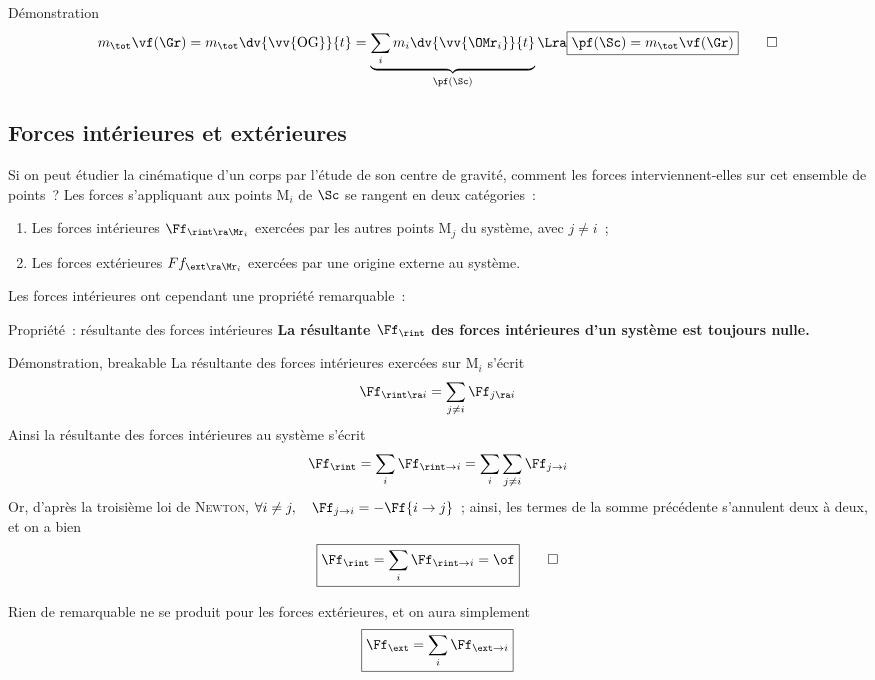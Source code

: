 \documentclass[../main/main.tex]{subfiles}
\begin{document}
\begin{tdemo}{Démonstration}
    \begin{gather*}
        m_{\tot}\vf(\Gr) = m_{\tot}\dv{\vv{\rm OG}}{t} =
            \underbrace{\sum_i m_i \dv{\vv{\OMr_i}}{t}}_{\pf(\Sc)}
        \Lra
        \boxed{\pf(\Sc) = m_{\tot}\vf(\Gr)}
        \qed
    \end{gather*}
\end{tdemo}

\subsection{Forces intérieures et extérieures}
Si on peut étudier la cinématique d'un corps par l'étude de son centre de
gravité, comment les forces interviennent-elles sur cet ensemble de points~?
Les forces s'appliquant aux points M$_i$ de $\Sc$ se rangent en deux
catégories~:
\begin{enumerate}
    \item Les forces intérieures $\Ff_{\rint\ra\Mr_i}$ exercées par les autres
        points M$_j$ du système, avec $j\neq i$~;
    \item Les forces extérieures $Ff_{\ext\ra\Mr_i}$ exercées par une origine
        externe au système.
\end{enumerate}
Les forces intérieures ont cependant une propriété remarquable~:
\begin{tprop}{Propriété~: résultante des forces intérieures}
    \centering\bfseries
    La résultante $\Ff_{\rint}$ des forces intérieures d'un système est toujours
    nulle.
\end{tprop}
\begin{tdemo}{Démonstration, breakable}
    La résultante des forces intérieures exercées sur M$_i$ s'écrit
    \[\Ff_{\rint\ra i} = \sum_{j\neq i}\Ff_{j\ra i}\]
    Ainsi la résultante des forces intérieures au système s'écrit
    \[\Ff_{\rint} = \sum_i \Ff_{\rint\to i} = \sum_i\sum_{j\neq i}\Ff_{j\to i}\]
    Or, d'après la troisième loi de \textsc{Newton}, $\forall i\neq j, \quad
    \Ff_{j\to i} = -\Ff{i\to j}$~; ainsi, les termes de la somme précédente
    s'annulent deux à deux, et on a bien
    \begin{gather*}
        \boxed{\Ff_{\rint} = \sum_i\Ff_{\rint\to i} = \of}
        \qed
    \end{gather*}
\end{tdemo}
Rien de remarquable ne se produit pour les forces extérieures, et on aura
simplement
\[\boxed{\Ff_{\ext} = \sum_i \Ff_{\ext\to i}}\]
\end{document}
